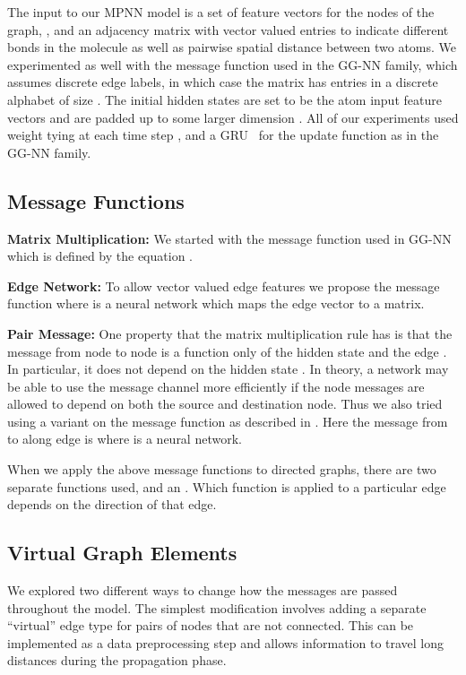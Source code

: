 \documentclass{article}
\begin{document}
The input to our MPNN model is a set of feature vectors for the nodes of the graph, , and an adjacency matrix  with vector valued entries to indicate different bonds in the molecule as well as pairwise spatial distance between two atoms. We experimented as well with the message function used in the GG-NN family, which assumes discrete edge labels, in which case the matrix  has entries in a discrete alphabet of size . The initial hidden states  are set to be the atom input feature vectors  and are padded up to some larger dimension . All of our experiments used weight tying at each time step , and a GRU~\citep{cho2014properties} for the update function as in the GG-NN family. 

\iffalse

\fi

\subsection{Message Functions}

\textbf{Matrix Multiplication:}
	We started with the message function used in GG-NN which is defined by the equation .
	
\textbf{Edge Network:}
	To allow vector valued edge features we propose the message function 
 where  is a neural network which maps the edge vector  to a  matrix. 

\textbf{Pair Message:}
	   One property that the matrix multiplication rule has is that the message from node  to node  is a function only of the hidden state  and the edge . In particular, it does not depend on the hidden state . In theory, a network may be able to use the message channel more efficiently if the node messages are allowed to depend on both the source and destination node. Thus we also tried using a variant on the message function as described in \cite{battaglia2016interaction}. Here the message from  to  along edge  is  where  is a neural network.

When we apply the above message functions to directed graphs, there are two separate functions used,  and an . Which function is applied to a particular edge  depends on the direction of that edge.

\subsection{Virtual Graph Elements}
	We explored two different ways to change how the messages are passed throughout the model. The simplest modification involves adding a separate ``virtual'' edge type for pairs of nodes that are not connected. This can be implemented as a data preprocessing step and allows information to travel long distances during the propagation phase. 
	
\end{document}
